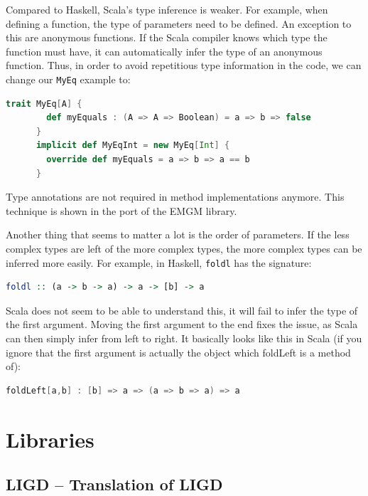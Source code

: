 \documentclass[abstracton,parskip=half]{scrreprt}
\newcommand{\cd}{\texttt}
\begin{document}
    Compared to Haskell, Scala's type inference is weaker. For example, when
    defining a function, the type of parameters need to be defined. An exception
    to this are anonymous functions. If the Scala compiler knows which type the
    function must have, it can automatically infer the type of an anonymous
    function. Thus, in order to avoid repetitious type information in the code,
    we can change our \cd{MyEq} example to:
    \begin{lstlisting}[language=Scala,gobble=6]
      trait MyEq[A] {
        def myEquals : (A => A => Boolean) = a => b => false
      }
      implicit def MyEqInt = new MyEq[Int] {
        override def myEquals = a => b => a == b
      }
    \end{lstlisting}
    Type annotations are not required in method implementations anymore. This
    technique is shown in the port of the EMGM library.

    Another thing that seems to matter a lot is the order of parameters. If
    the less complex types are left of the more complex types, the more
    complex types can be inferred more easily. For example, in Haskell,
    \cd{foldl} has the signature:
    \begin{lstlisting}[language=Haskell,gobble=6]
      foldl :: (a -> b -> a) -> a -> [b] -> a
    \end{lstlisting}
    Scala does not seem to be able to understand this, it will fail to
    infer the type of the first argument. Moving the first argument to
    the end fixes the issue, as Scala can then simply infer from left
    to right. It basically looks like this in Scala (if you ignore that
    the first argument is actually the object which foldLeft is a method
    of):
    \begin{lstlisting}[language=Scala,gobble=6]
      foldLeft[a,b] : [b] => a => (a => b => a) => a
    \end{lstlisting}


    \chapter{Libraries}

    \section{LIGD -- Translation of LIGD}
    
\end{document}
